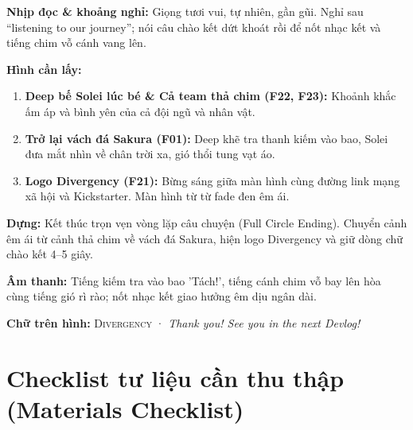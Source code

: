 \documentclass[11pt,a4paper]{article}
\newcommand{\field}[2]{\textbf{\color{divergencynavy}#1:} #2\par\vspace{2pt}}
\begin{document}
\field{Nhịp đọc \& khoảng nghỉ}{Giọng tươi vui, tự nhiên, gần gũi. Nghỉ sau “listening to our journey”; nói câu chào kết dứt khoát rồi để nốt nhạc kết và tiếng chim vỗ cánh vang lên.}

\field{Hình cần lấy}{
\begin{enumerate}
    \item \textbf{Deep bế Solei lúc bé \& Cả team thả chim (F22, F23):} Khoảnh khắc ấm áp và bình yên của cả đội ngũ và nhân vật.
    \item \textbf{Trở lại vách đá Sakura (F01):} Deep khẽ tra thanh kiếm vào bao, Solei đưa mắt nhìn về chân trời xa, gió thổi tung vạt áo.
    \item \textbf{Logo Divergency (F21):} Bừng sáng giữa màn hình cùng đường link mạng xã hội và Kickstarter. Màn hình từ từ fade đen êm ái.
\end{enumerate}}

\field{Dựng}{Kết thúc trọn vẹn vòng lặp câu chuyện (Full Circle Ending). Chuyển cảnh êm ái từ cảnh thả chim về vách đá Sakura, hiện logo Divergency và giữ dòng chữ chào kết 4--5 giây.}

\field{Âm thanh}{Tiếng kiếm tra vào bao 'Tách!', tiếng cánh chim vỗ bay lên hòa cùng tiếng gió rì rào; nốt nhạc kết giao hưởng êm dịu ngân dài.}

\field{Chữ trên hình}{\textsc{Divergency} · \textit{Thank you! See you in the next Devlog!}}

\newpage
\section{Checklist tư liệu cần thu thập (Materials Checklist)}
\end{document}
